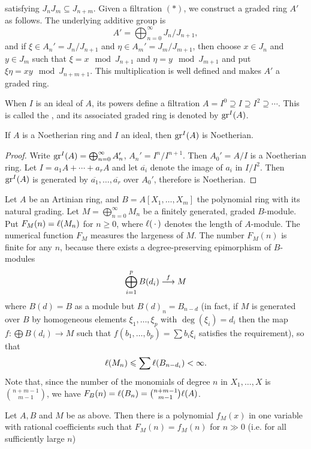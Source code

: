 \documentclass[../main]{subfiles}
\begin{document}
satisfying $J_n J_m \subseteq J_{n+m}$. Given a filtration $(*)$, we construct a graded ring $A'$ as follows. The underlying additive group is \[A'=\bigoplus_{n=0}^\infty J_n / J_{n+1},\] and if $\xi \in A_n'=J_n / J_{n+1}$ and $\eta \in A_m'=J_m / J_{m+1}$, then choose $x \in J_n$ and $y \in J_m$ such that $\xi=x \mod J_{n+1}$ and $\eta=y\mod J_{m+1}$ and put $\xi\eta= xy \mod J_{n+m+1}$. This multiplication is well defined and makes $A'$ a graded ring.

When $I$ is an ideal of $A$, its powers define a filtration $A=I^0\supseteq I \supseteq I^2 \supseteq \cdots$. This is called the , and its associated graded ring is denoted by $\operatorname{gr}^I(A)$.

\begin{parproposition}
If $A$ is a Noetherian ring and $I$ an ideal, then $\operatorname{gr}^I(A)$ is Noetherian.
\end{parproposition}

\begin{proof}
Write $\operatorname{gr}^I(A)=\bigoplus_{n=0}^\infty A'_n$, $A_n'=I^n / I^{n+1}$. Then $A_0'=A / I$ is a Noetherian ring. Let $I=a_1 A+\cdots+a_r A$ and let $\overline{a_i}$ denote the image of $a_i$ in $I / I^2$. Then $\operatorname{gr}^I(A)$ is generated by $\overline{a_1}, \ldots, \overline{a_r}$ over $A_0'$, therefore is Noetherian.
\end{proof}

\newparagraph Let $A$ be an Artinian ring, and $B=A[X_1, \ldots, X_m]$ the polynomial ring with its natural grading. Let $M=\bigoplus_{n=0}^\infty M_n$ be a finitely generated, graded $B$-module. Put $F_M(n)=\ell(M_n)$ for $n \geqslant 0$, where $\ell(\,\cdot\,)$ denotes the length of $A$-module. The numerical function $F_M$ measures the largeness of $M$. The number $F_M(n)$ is finite for any $n$, because there exists a degree-preserving epimorphism of $B$-modules \[\bigoplus_{i=1}^pB(d_i)\varrightarrow{f}M\] where $B(d)=B$ as a module but $B(d)_n=B_{n-d}$ (in fact, if $M$ is generated over $B$ by homogeneous elements $\xi_1, \ldots, \xi_p$ with $\deg(\xi_i)=d_i$ then the map $f: \bigoplus B(d_i) \longrightarrow M$ such that $f(b_1, \ldots, b_p)=\sum b_i \xi_i$ satisfies the requirement), so that \[\ell(M_n) \leqslant \sum \ell(B_{n-d_i})<\infty.\]
Note that, since the number of the monomials of degree $n$ in $X_1, \ldots, X$ is $\binom{n+m-1}{m-1}$, we have $F_B(n)=\ell(B_n)=\binom{n+m-1}{m-1}\ell(A)$.

\begin{partheorem}\label{thm:014}
Let $A, B$ and $M$ be as above. Then there is a polynomial $f_M(x)$ in one variable with rational coefficients such that $F_M(n)=f_M(n)$ for $n \gg 0$ (i.e. for all sufficiently large $n$)
\end{partheorem}
\end{document}
